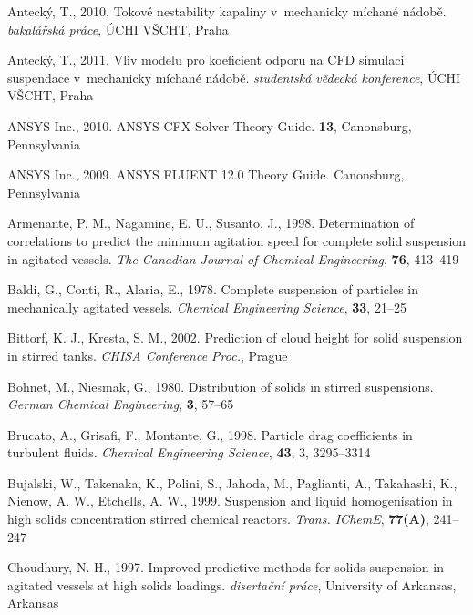 \begin{thebibliography}{99}

 Antecký, T., 2010. Tokové nestability kapaliny v~mechanicky míchané nádobě. \textit{bakalářská práce}, ÚCHI VŠCHT, Praha 

 Antecký, T., 2011. Vliv modelu pro koeficient odporu na CFD simulaci suspendace v~mechanicky míchané nádobě. \textit{studentská vědecká konference}, ÚCHI VŠCHT, Praha 

 ANSYS Inc., 2010. ANSYS CFX-Solver Theory Guide. \textbf{13}, Canonsburg, Pennsylvania

 ANSYS Inc., 2009. ANSYS FLUENT 12.0 Theory Guide. Canonsburg, Pennsylvania

 Armenante, P. M., Nagamine, E. U., Susanto, J., 1998. Determination of correlations to predict the minimum agitation speed for complete solid suspension in agitated vessels. \textit{The Canadian Journal of Chemical Engineering}, \textbf{76}, 413--419

 Baldi, G., Conti, R., Alaria, E., 1978. Complete suspension of particles in mechanically agitated vessels. \textit{Chemical Engineering Science}, \textbf{33}, 21--25 

 Bittorf, K. J., Kresta, S. M., 2002. Prediction of cloud height for solid suspension in stirred tanks. \textit{CHISA Conference Proc.}, Prague

 Bohnet, M., Niesmak, G., 1980. Distribution of solids in stirred suspensions. \textit{German
Chemical Engineering}, \textbf{3}, 57--65

 Brucato, A., Grisafi, F., Montante, G., 1998. Particle drag coefficients in turbulent fluids. \textit{Chemical Engineering Science}, \textbf{43}, 3, 3295--3314

 Bujalski, W., Takenaka, K., Polini, S., Jahoda, M., Paglianti, A., Takahashi, K., Nienow, A. W., Etchells, A. W., 1999. Suspension and liquid homogenisation in high solids concentration stirred chemical reactors. \textit{Trans. IChemE}, \textbf{77(A)}, 241--247

 Choudhury, N. H., 1997. Improved predictive methods for solids suspension in agitated vessels at high solids loadings. \textit{disertační práce},  University of Arkansas, Arkansas


\end{thebibliography}
